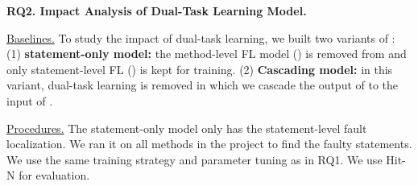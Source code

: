 
%
%





{\bf RQ2. Impact Analysis of Dual-Task Learning Model.}

\underline{Baselines.} To study the impact of dual-task learning, we built two variants of {\tool}: 
(1) \textbf{statement-only model:} the method-level FL model
() is removed from {\tool} and only statement-level FL
() is kept for training. (2) \textbf{Cascading model:} in
this variant, dual-task learning is removed in which we cascade the
output of  to the input of .



\underline{Procedures.}
The statement-only model only has the statement-level fault
localization. We ran it on all methods in the project to find the
faulty statements. We use the same training strategy and parameter
tuning as in RQ1.
We use Hit-N for evaluation.


